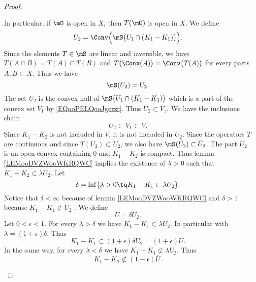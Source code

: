 \begin{proof}
\begin{subproof}
        In particular, if \( \mO\) is open in \( X\), then \( T(\mO)\) is open in \( X\).
    \spitem[Définition of \( U_2\)]
        We define
        \begin{equation}       
            U_2=\Conv\Big( \mS\big(  U_1\cap(K_1-K_1)  \big) \Big).
        \end{equation}
        Since the elements \( T\in \mS\) are linear and inversible, we have \( T(A\cap B)=T(A)\cap T(B)\) and \( T\big( \Conv(A) \big)=\Conv\big( T(A) \big)\) for every parts \( A,B\subset X\). Thus we have
        \begin{equation}
            \mS(U_2)=U_2.
        \end{equation}
    \spitem[\( K_1-K_1\subsetneq U_2\)]
        The set \( U_2\) is the convex hull of \( \mS\big( U_1\cap (K_1-K_1) \big)\) which is a part of the convex set \( V_1\) by \eqref{EQooPELQooJgcrzr}. Thus \( U_2\subset V_1\). We have the inclusions chain
        \begin{equation}
            U_2\subset V_1\subset V.
        \end{equation}
        Since \( K_1-K_2\) is not included in \( V\), it is not included in \( U_2\).
    \spitem[Definition of \( U\)]
        Since the operators \( T\) are continuous and since \( T(U_2)\subset U_2\), we also have \( \mS(\bar U_2)\subset \bar U_2\). The part \( U_2 \) is an open convex containing \( 0\) and \( K_1-K_2\) is compact. Thus lemma \ref{LEMooDVZWooWKRQWC} implies the existence of \( \lambda>0\) such that \( K_1-K_2 \subset \lambda U_2\). Let
        \begin{equation}
            \delta=\inf\{ \lambda>0\tq K_1-K_1\subset \lambda U_2 \}.
        \end{equation}
        Notice that \( \delta<\infty\) because of lemma \ref{LEMooDVZWooWKRQWC} and \( \delta >1\) because \( K_1-K_1\nsubset U_2\) . We define
        \begin{equation}
            U=\delta U_2.
        \end{equation}
        Let \(   0<\epsilon<1   \). For every \( \lambda>\delta\) we have \( K_1-K_1\subset \lambda U_2\). In particular with \( \lambda= (1+\epsilon)\delta\). Thus
        \begin{equation}
            K_1-K_1\subset (1+\epsilon)\delta U_2=(1+\epsilon)U.
        \end{equation}
        In the same way, for every \( \lambda<\delta\) we have \( K_1-K_1\nsubset \lambda U_2\). Thus
        \begin{equation}        \label{EQooNYNTooQScVJL}
            K_1-K_2\nsubset (1-\epsilon)\bar U.
        \end{equation}
        

\end{subproof}
\end{proof}
